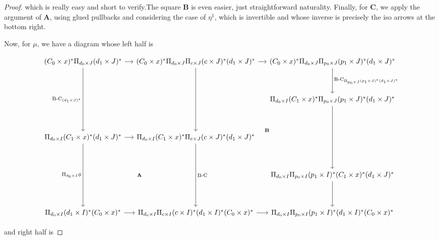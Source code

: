 \documentclass[10pt, oneside]{article}
\begin{document}
\begin{proof}
	\noindent which is really easy and short to verify.The square $\mathbf{B}$ is even easier, just straightforward naturality. Finally, for $\mathbf{C}$, we apply the argument of $\mathbf{A}$, using glued pullbacks and considering the case of $\eta^1$, which is invertible and whose inverse is precisely the iso arrows at the bottom right.
	
	Now, for $\mu$, we have a diagram whose left half is
	
	\[\begin{tikzcd}[column sep=tiny]
		{(C_0 \times x)^\ast \Pi_{d_0 \times J}(d_1 \times J)^\ast} && {(C_0 \times x)^\ast \Pi_{d_0 \times J} \Pi_{c \times J} (c \times J)^\ast (d_1 \times J)^\ast} && {(C_0 \times x)^\ast \Pi_{d_0 \times J} \Pi_{p_0 \times J} (p_1 \times J)^\ast (d_1 \times J)^\ast} \\
		\\
		&&&& {\Pi_{d_0 \times I} (C_1 \times x)^\ast \Pi_{p_0 \times J} (p_1 \times J)^\ast (d_1 \times J)^\ast} \\
		\\
		{\Pi_{d_0 \times I} (C_1 \times x)^\ast (d_1 \times J)^\ast } && {\Pi_{d_0 \times I} (C_1 \times x)^\ast \Pi_{c \times J} (c \times J)^\ast(d_1 \times J)^\ast } \\
		\\
		&&&& {\Pi_{d_0 \times I} \Pi_{p_0 \times I} (p_1 \times I)^\ast (C_1 \times x)^\ast (d_1 \times J)^\ast} \\
		\\
		{\Pi_{d_0 \times I} (d_1 \times I)^\ast (C_0 \times x)^\ast} && {\Pi_{d_0 \times I} \Pi_{c \times I} (c \times I)^\ast (d_1 \times I)^\ast (C_0 \times x)^\ast} && {\Pi_{d_0 \times I} \Pi_{p_0 \times I} (p_1 \times I)^\ast (d_1 \times I)^\ast (C_0 \times x)^\ast}
		\arrow[from=1-1, to=1-3]
		\arrow[from=1-3, to=1-5]
		\arrow["{\text{B-C}_{(d_1 \times J)^\ast}}"', from=1-1, to=5-1]
		\arrow["{\Pi_{d_0 \times I} \phi}"', from=5-1, to=9-1]
		\arrow[from=9-1, to=9-3]
		\arrow[from=9-3, to=9-5]
		\arrow[from=5-1, to=5-3]
		\arrow[from=1-3, to=5-3]
		\arrow[""{name=0, anchor=center, inner sep=0}, "{\text{B-C}}", from=5-3, to=9-3]
		\arrow["{\text{B-C}_{\Pi_{p_0 \times J} (p_1 \times J)^\ast (d_1 \times J)^\ast}}", from=1-5, to=3-5]
		\arrow[from=3-5, to=7-5]
		\arrow[from=7-5, to=9-5]
		\arrow["{\mathbf{A}}"{description}, draw=none, from=9-1, to=5-3]
		\arrow["{\mathbf{B}}"{pos=0.6}, draw=none, from=0, to=3-5]
	\end{tikzcd}\]
	
	\noindent and right half is
	

\end{proof}
\end{document}
